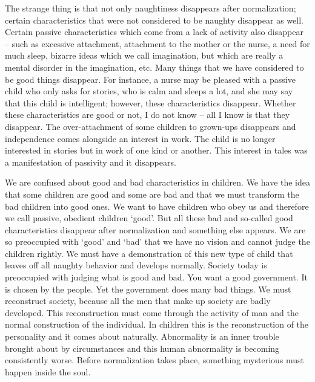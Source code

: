 \documentclass[lang=cn,10pt]{elegantbook}
\begin{document}
The strange thing is that not only naughtiness disappears after
normalization; certain characteristics that were not considered to be
naughty disappear as well. Certain passive characteristics which
come from a lack of activity also disappear – such as excessive
attachment, attachment to the mother or the nurse, a need for much
sleep, bizarre ideas which we call imagination, but which are really a
mental disorder in the imagination, etc. Many things that we have
considered to be good things disappear. For instance, a nurse may
be pleased with a passive child who only asks for stories, who is
calm and sleeps a lot, and she may say that this child is intelligent;
however, these characteristics disappear. Whether these
characteristics are good or not, I do not know – all I know is that they
disappear. The over-attachment of some children to grown-ups
disappears and independence comes alongside an interest in work.
The child is no longer interested in stories but in work of one kind or
another. This interest in tales was a manifestation of passivity and it
disappears.

We are confused about good and bad characteristics in
children. We have the idea that some children are good and some
are bad and that we must transform the bad children into good ones.
We want to have children who obey us and therefore we call
passive, obedient children ‘good’. But all these bad and so-called
good characteristics disappear after normalization and something
else appears. We are so preoccupied with ‘good’ and ‘bad’ that we
have no vision and cannot judge the children rightly. We must have a
demonstration of this new type of child that leaves off all naughty
behavior and develops normally. Society today is preoccupied with
judging what is good and bad. You want a good government. It is
chosen by the people. Yet the government does many bad things.
We must reconstruct society, because all the men that make up
society are badly developed. This reconstruction must come through
the activity of man and the normal construction of the individual. In
children this is the reconstruction of the personality and it comes
about naturally. Abnormality is an inner trouble brought about by
circumstances and this human abnormality is becoming consistently
worse. Before normalization takes place, something mysterious must
happen inside the soul.
\end{document}

